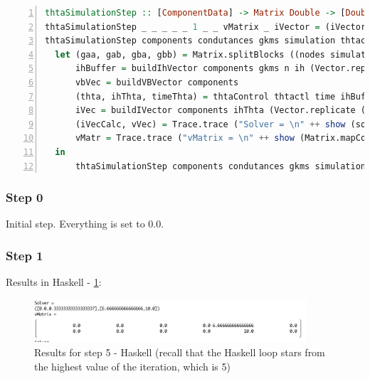 \begin{lstlisting}[language=Haskell, numbers=left, caption={Logging the values of I and V at the Haskell implementation}, captionpos=b, label={lst:logginghs}]
thtaSimulationStep :: [ComponentData] -> Matrix Double -> [Double] -> SimulationData -> Int -> Int -> Double  -> Vector Double -> Matrix Double -> Vector Double -> Vector Double -> SimulationResults
thtaSimulationStep _ _ _ _ _ 1 _ _ vMatrix _ iVector = (iVector, vMatrix)
thtaSimulationStep components condutances gkms simulation thtactl n time ih vMatrix vbVector iVector =
  let (gaa, gab, gba, gbb) = Matrix.splitBlocks ((nodes simulation) - (voltageSources simulation)) ((nodes simulation) - (voltageSources simulation)) condutances
      ihBuffer = buildIhVector components gkms n ih (Vector.replicate (nh (Vector.fromList components)) 0) vMatrix
      vbVec = buildVBVector components
      (thta, ihThta, timeThta) = thtaControl thtactl time ihBuffer ih
      iVec = buildIVector components ihThta (Vector.replicate (nodes simulation) 0)
      (iVecCalc, vVec) = Trace.trace ("Solver = \n" ++ show (solver (toHMatrixVectorTransformer iVec) (toHMatrixTransformer gaa) (toHMatrixTransformer gab) (toHMatrixTransformer gba) (toHMatrixTransformer gbb) (toHMatrixVectorTransformer vbVec) simulation)) solver (toHMatrixVectorTransformer iVec) (toHMatrixTransformer gaa) (toHMatrixTransformer gab) (toHMatrixTransformer gba) (toHMatrixTransformer gbb) (toHMatrixVectorTransformer vbVec) simulation
      vMatr = Trace.trace ("vMatrix = \n" ++ show (Matrix.mapCol (\r _ -> vVec Vector.! (r - 1)) (n-1) vMatrix)) Matrix.mapCol (\r _ -> vVec Vector.! (r - 1)) (n-1) vMatrix
  in
      thtaSimulationStep components condutances gkms simulation thta (n-1) time ihThta vMatr vbVec iVecCalc

\end{lstlisting}

\subsubsection{Step 0}
Initial step. Everything is set to 0.0.

\subsubsection{Step 1}

Results in Haskell - \cref{h1}:

\begin{figure}[H]
   \centering
   \includegraphics[width=0.9\textwidth]{img/h1.png}
   \caption{Results for step 5 - Haskell (recall that the Haskell loop stars from the highest value of the iteration, which is 5)}
   \label{h1}
\end{figure}

